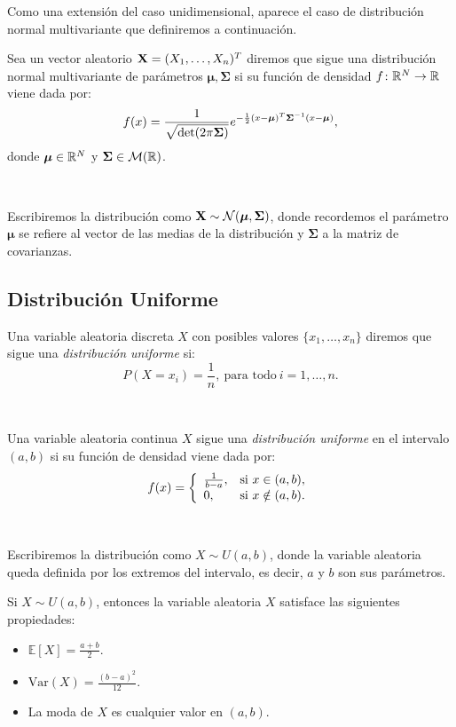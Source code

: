 \documentclass[oneside,openright,titlepage,numbers=noenddot,openany,headinclude,footinclude=true,
cleardoublepage=empty,abstractoff,BCOR=5mm,paper=a4,fontsize=12pt,main=spanish]{scrreprt}
\begin{document}
Como una extensión del caso unidimensional, aparece el caso de distribución normal multivariante que definiremos a continuación.\\

\begin{definition}
Sea un vector aleatorio $\textbf{X}=(X_1,\dots,X_n)^T$ diremos que sigue una distribución normal multivariante de parámetros $\bm{\mu},\bm{\Sigma}$ si su función de densidad $f\colon \mathbb{R}^N \to \mathbb{R}$ viene dada por: $$f(x)=\frac{\displaystyle 1}{\displaystyle \sqrt{\text{det}(2\pi \bm{\Sigma})}}e^{-\frac{1}{2}(x-\bm{\mu})^T\bm{\Sigma}^{-1}(x-\bm{\mu})},$$
donde $\bm{\mu}\in \mathbb{R}^N$ y $\bm{\Sigma}\in \mathcal{M}(\mathbb{R})$.
\end{definition}\

Escribiremos la distribución como $\textbf{X} \sim \mathcal{N}(\bm{\mu}, \bm{\Sigma})$, donde recordemos el parámetro $\bm{\mu}$ se refiere al vector de las medias de la distribución y $\bm{\Sigma}$ a la matriz de covarianzas.

\subsection{Distribución Uniforme}

\begin{definition}
Una variable aleatoria discreta $X$ con posibles valores $\{x_1,\dots,x_n\}$ diremos que sigue una \textit{distribución uniforme} si: $$P(X=x_i)=\frac{1}{n}, \ \text{para todo} \ i=1,\dots,n.$$
\end{definition}\

\begin{definition}
Una variable aleatoria continua $X$ sigue una \textit{distribución uniforme} en el intervalo $(a,b)$ si su función de densidad viene dada por: $$f(x)=\left \{
\begin{array}{l l}
\frac{1}{b-a}, & \mbox{si } x \in (a,b), \\
0, & \mbox{si } x \notin (a,b).
\end{array}
\right.$$
\end{definition}\

Escribiremos la distribución como $X \sim U(a,b)$, donde la variable aleatoria queda definida por los extremos del intervalo, es decir, $a$ y $b$ son sus parámetros.\\

\begin{proposition}[Propiedades]
Si $X \sim U(a,b)$, entonces la variable aleatoria $X$ satisface las siguientes propiedades:
\begin{itemize}
    \item $\mathbb{E}[X]=\frac{a+b}{2}$.
    \item $\text{Var}(X)=\frac{(b-a)^2}{12}$.
    \item La moda de $X$ es cualquier valor en $(a,b)$.
\end{itemize}
\end{proposition}
\end{document}
